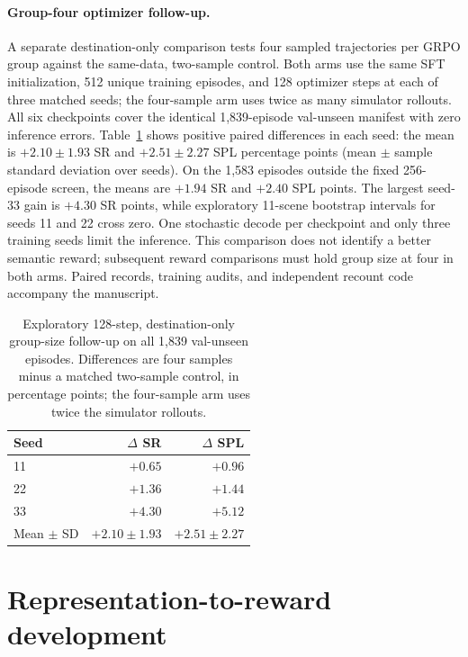 \documentclass[10pt,twocolumn,letterpaper]{article}
\begin{document}
\paragraph{Group-four optimizer follow-up.} A separate destination-only
comparison tests four sampled trajectories per GRPO group against the
same-data, two-sample control. Both arms use the same SFT initialization,
512 unique training episodes, and 128 optimizer steps at each of three
matched seeds; the four-sample arm uses twice as many simulator rollouts.
All six checkpoints cover the identical 1,839-episode val-unseen manifest
with zero inference errors. Table~\ref{tab:group4-followup} shows positive
paired differences in each seed: the mean is $+2.10\pm1.93$ SR and
$+2.51\pm2.27$ SPL percentage points (mean $\pm$ sample standard deviation
over seeds). On the 1,583 episodes outside the fixed 256-episode screen,
the means are $+1.94$ SR and $+2.40$ SPL points. The largest seed-33 gain
is $+4.30$ SR points, while exploratory 11-scene bootstrap intervals for
seeds 11 and 22 cross zero. One stochastic decode per checkpoint and only
three training seeds limit the inference. This comparison does not
identify a better semantic reward; subsequent reward comparisons must
hold group size at four in both arms. Paired records, training audits,
and independent recount code accompany the manuscript.

\begin{table}[t]
\centering
\caption{Exploratory 128-step, destination-only group-size follow-up on all
1,839 val-unseen episodes. Differences are four samples minus a matched
two-sample control, in percentage points; the four-sample arm uses twice
the simulator rollouts.}
\label{tab:group4-followup}
\footnotesize
\begin{tabular}{lrr}
\toprule
Seed & $\Delta$ SR & $\Delta$ SPL \\
\midrule
11 & $+0.65$ & $+0.96$ \\
22 & $+1.36$ & $+1.44$ \\
33 & $+4.30$ & $+5.12$ \\
Mean $\pm$ SD & $+2.10\pm1.93$ & $+2.51\pm2.27$ \\
\bottomrule
\end{tabular}
\end{table}


\section{Representation-to-reward development}
\label{sec:representation-followups}
\end{document}
